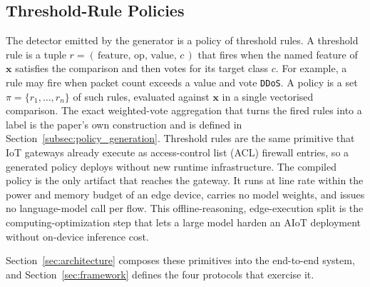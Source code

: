 \subsection{Threshold-Rule Policies}
\label{subsec:thresholdpolicy}

The detector emitted by the generator is a policy of threshold rules. A
threshold rule is a tuple $r = (\,\text{feature},\, \text{op},\,
\text{value},\, c\,)$ that fires when the named feature of $\mathbf{x}$
satisfies the comparison and then votes for its target class $c$. For
example, a rule may fire when packet count exceeds a value and vote
\texttt{DDoS}. A policy is a set $\pi = \{r_1, \dots, r_n\}$ of such rules,
evaluated against $\mathbf{x}$ in a single vectorised comparison. The exact
weighted-vote aggregation that turns the fired rules into a label is the
paper's own construction and is defined in
Section~\ref{subsec:policy_generation}. Threshold rules are the same
primitive that IoT gateways already execute as access-control list (ACL)
firewall entries, so a generated policy deploys without new runtime
infrastructure. The compiled policy is the only artifact that reaches the
gateway. It runs at line rate within the power and memory budget of an edge
device, carries no model weights, and issues no language-model call per flow.
This offline-reasoning, edge-execution split is the computing-optimization
step that lets a large model harden an AIoT deployment without on-device
inference cost.

Section~\ref{sec:architecture} composes these primitives into the end-to-end
system, and Section~\ref{sec:framework} defines the four protocols that
exercise it.
